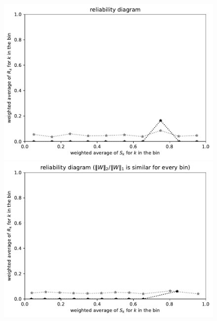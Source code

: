 \documentclass{article}
\begin{document}
\begin{figure}
\begin{centering}
\parbox{\imsize}{\includegraphics[width=\imsize]
                {./codes/weighted/50000_2500_10_3/equiscores.pdf}}
\quad\quad
\parbox{\imsize}{\includegraphics[width=\imsize]
                {./codes/weighted/50000_2500_10_3/equierrs.pdf}}

\vspace{\vertsep}


\end{centering}
\end{figure}
\end{document}
